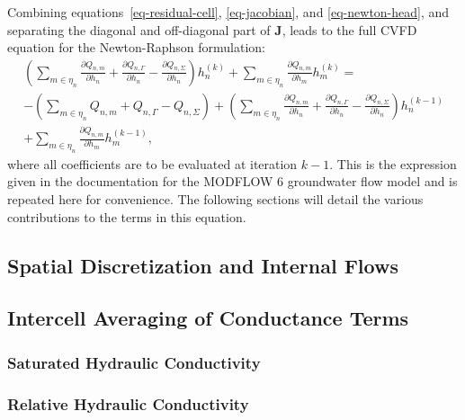 \documentclass[fleqn]{article}
\begin{document}
Combining equations~\ref{eq-residual-cell}, \ref{eq-jacobian},
and \ref{eq-newton-head}, and separating the diagonal and
off-diagonal part of $\mathbf{J}$, leads to the full CVFD
equation for the Newton-Raphson formulation:
\begin{equation}
  \begin{split}
    \left(
    \sum_{m \in \eta_n}
    \frac{\partial Q_{n,m}}{\partial h_n} + 
    \frac{\partial Q_{n, \Gamma}}{\partial h_n} - 
    \frac{\partial Q_{n,\Sigma}}{\partial h_n}
    \right)
    h_n^{(k)} +
    \sum_{m \in \eta_n} \frac{\partial Q_{n,m}}{\partial h_m}
    h_m^{(k)} =\\
    - 
    \left(
    \sum_{m \in \eta_n} Q_{n,m} + 
    Q_{n, \Gamma} - 
    Q_{n,\Sigma}
    \right) +
    \left(
    \sum_{m \in \eta_n}
    \frac{\partial Q_{n,m}}{\partial h_n} + 
    \frac{\partial Q_{n, \Gamma}}{\partial h_n} - 
    \frac{\partial Q_{n,\Sigma}}{\partial h_n}
    \right)
    h_n^{(k-1)}\\
    + \sum_{m \in \eta_n} \frac{\partial Q_{n,m}}{\partial h_m}
    h_m^{(k-1)},
  \end{split}
  \label{eq-cvfd-nr}
\end{equation}
where all coefficients are to be evaluated at iteration $k-1$. 
This is the expression given in the documentation for the
MODFLOW 6 groundwater flow model and is repeated here for
convenience. The following sections will detail the various
contributions to the terms in this equation.

\subsection{Spatial Discretization and Internal Flows}
\subsection{Intercell Averaging of Conductance Terms}\label{sec-cond-avg}
\subsubsection*{Saturated Hydraulic Conductivity}
\subsubsection*{Relative Hydraulic Conductivity}
\end{document}
